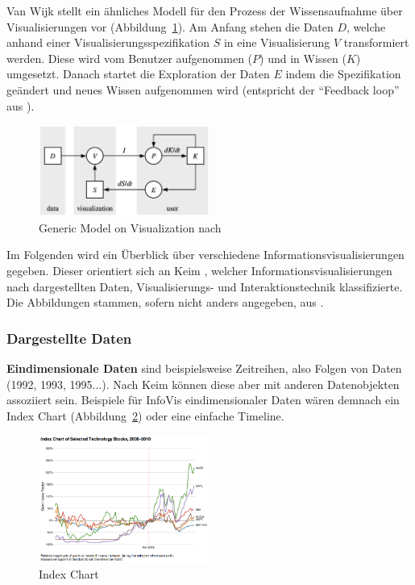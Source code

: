 \documentclass[
	headsepline,
	footsepline,
	fontsize=12pt,
	bibliography=totoc
]{scrbook}
\begin{document}
Van Wijk \cite{vanWijk2005} stellt ein ähnliches Modell für den Prozess der Wissensaufnahme über Visualisierungen vor (Abbildung~\ref{figure:visualization_model}). Am Anfang stehen die Daten $D$, welche anhand einer Visualisierungsspezifikation $S$ in eine Visualisierung $V$ transformiert werden. Diese wird vom Benutzer aufgenommen ($P$) und in Wissen ($K$) umgesetzt. Danach startet die Exploration der Daten $E$ indem die Spezifikation geändert und neues Wissen aufgenommen wird (entspricht der \enquote{Feedback loop} aus \cite{Kohlhammer2011}).

\begin{figure}[htbp]
   \centering
   \includegraphics[width=0.5\textwidth]{images/grundlagen-visualization_model.png} 
   \caption{Generic Model on Visualization nach \cite{vanWijk2005}}
   \label{figure:visualization_model}
\end{figure}


Im Folgenden wird ein Überblick über verschiedene Informationsvisualisierungen gegeben. Dieser orientiert sich an Keim \cite{Keim2002}, welcher Informationsvisualisierungen nach dargestellten Daten, Visualisierungs- und Interaktionstechnik klassifizierte. Die Abbildungen stammen, sofern nicht anders angegeben, aus \cite{Heer2010}.

\subsubsection{Dargestellte Daten}
\label{section:standderforschung:grundlagen:informationsvisualisierung:dargestellte_daten}

\textbf{Eindimensionale Daten} sind beispielsweise Zeitreihen, also Folgen von Daten (1992, 1993, 1995...). Nach Keim können diese aber mit anderen Datenobjekten assoziiert sein. Beispiele für InfoVis eindimensionaler Daten wären demnach ein Index Chart (Abbildung~\ref{figure:index_chart}) oder eine einfache Timeline.

\begin{figure}[htbp]
   \centering
   \includegraphics[width=0.5\textwidth]{images/grundlagen-index_chart.png}
   \caption{Index Chart}
   \label{figure:index_chart}
\end{figure}
\end{document}
